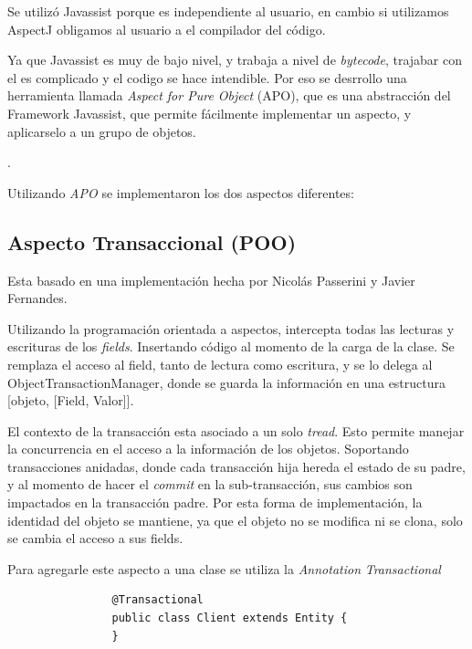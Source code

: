 \medskip 

Se utilizó Javassist porque es independiente al usuario, en cambio si utilizamos
AspectJ obligamos al usuario a el compilador del código. 

\medskip 

Ya que Javassist es muy de bajo nivel, y trabaja a nivel de \emph{bytecode},
trajabar con el es complicado y el codigo se hace intendible. Por eso se
desrrollo una herramienta llamada \emph{ Aspect for Pure Object} (APO), que es 
una abstracción del Framework Javassist, que permite fácilmente implementar un
aspecto, y aplicarselo a un grupo de objetos.

.

\medskip 

Utilizando \emph{APO} se implementaron los dos aspectos diferentes:

	\subsection{Aspecto Transaccional (POO)} 
		Esta basado en una implementación
		hecha por Nicolás Passerini y Javier Fernandes.
		 
		Utilizando la programación orientada a aspectos, intercepta todas las lecturas
		y escrituras de los \emph{fields}. Insertando código al momento de la carga de
		la clase.
		Se remplaza el acceso al field, tanto de lectura como escritura, y se lo delega
		al ObjectTransactionManager, donde se guarda la información en una estructura
		[objeto, [Field, Valor]].
		
		\medskip
		
		El contexto de la transacción esta asociado a un solo \emph{tread}. Esto
		permite manejar la concurrencia en el acceso a la información de los objetos. 
		Soportando transacciones anidadas, donde cada transacción hija hereda el estado
		de su padre, y al momento de hacer el \emph{commit} en la sub-transacción, sus
		cambios son impactados en la transacción padre.
		Por esta forma de implementación, la identidad del objeto se mantiene, ya que
		el objeto no se modifica ni se clona, solo se cambia el acceso a sus fields.
		
		Para agregarle este aspecto a una clase se utiliza la \emph{Annotation}
		\emph{Transactional }
		
			\begin{lstlisting} 
				@Transactional
				public class Client extends Entity {
				}
			\end{lstlisting}

